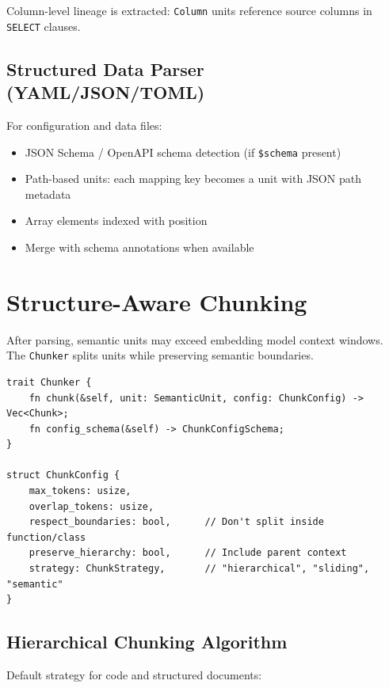 Column-level lineage is extracted: \texttt{Column} units reference source columns in \texttt{SELECT} clauses.

\subsection{Structured Data Parser (YAML/JSON/TOML)}
\label{sec:parsing:structured}

For configuration and data files:
\begin{itemize}
  \item JSON Schema / OpenAPI schema detection (if \texttt{\$schema} present)
  \item Path-based units: each mapping key becomes a unit with JSON path metadata
  \item Array elements indexed with position
  \item Merge with schema annotations when available
\end{itemize}

\section{Structure-Aware Chunking}
\label{sec:parsing:chunking}

After parsing, semantic units may exceed embedding model context windows. The \texttt{Chunker} splits units while preserving semantic boundaries.

\begin{interface}[Chunker]
\label{iface:chunker-detail}
\begin{verbatim}
trait Chunker {
    fn chunk(&self, unit: SemanticUnit, config: ChunkConfig) -> Vec<Chunk>;
    fn config_schema(&self) -> ChunkConfigSchema;
}

struct ChunkConfig {
    max_tokens: usize,
    overlap_tokens: usize,
    respect_boundaries: bool,      // Don't split inside function/class
    preserve_hierarchy: bool,      // Include parent context
    strategy: ChunkStrategy,       // "hierarchical", "sliding", "semantic"
}
\end{verbatim}
\end{interface}

\subsection{Hierarchical Chunking Algorithm}
\label{sec:parsing:hierarchical-chunk}

Default strategy for code and structured documents:

